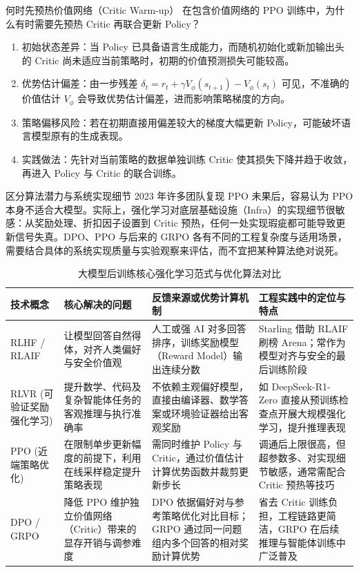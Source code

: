\documentclass[UTF8,a4paper,11pt,fontset=fandol]{ctexart}
\begin{document}
\begin{importantbox}{何时先预热价值网络（Critic Warm-up）}
在包含价值网络的 PPO 训练中，为什么有时需要先预热 Critic 再联合更新 Policy？
\begin{enumerate}
\item 初始状态差异：当 Policy 已具备语言生成能力，而随机初始化或新加输出头的 Critic 尚未适应当前策略时，初期的价值预测损失可能较高。
\item 优势估计偏差：由一步残差 \(\delta_t = r_t + \gamma V_\phi(s_{t+1}) - V_\phi(s_t)\) 可见，不准确的价值估计 \(V_\phi\) 会导致优势估计偏差，进而影响策略梯度的方向。
\item 策略偏移风险：若在初期直接用偏差较大的梯度大幅更新 Policy，可能破坏语言模型原有的生成表现。
\item 实践做法：先针对当前策略的数据单独训练 Critic 使其损失下降并趋于收敛，再进入 Policy 与 Critic 的联合训练。
\end{enumerate}
\end{importantbox}
\begin{warningbox}{区分算法潜力与系统实现细节}
2023 年许多团队复现 PPO 未果后，容易认为 PPO 本身不适合大模型。实际上，强化学习对底层基础设施（Infra）的实现细节很敏感：从奖励处理、折扣因子设置到 Critic 预热，任何一处实现瑕疵都可能导致更新信号失真。DPO、PPO 与后来的 GRPO 各有不同的工程复杂度与适用场景，需要结合具体的系统实现质量与实验观察来评估，而不宜把某种算法绝对说死。
\end{warningbox}
\begin{table}[H]\centering\small
\caption{大模型后训练核心强化学习范式与优化算法对比}
\begin{tabular}{>{\raggedright\arraybackslash}p{\dimexpr(\linewidth-8\tabcolsep)/4\relax}>{\raggedright\arraybackslash}p{\dimexpr(\linewidth-8\tabcolsep)/4\relax}>{\raggedright\arraybackslash}p{\dimexpr(\linewidth-8\tabcolsep)/4\relax}>{\raggedright\arraybackslash}p{\dimexpr(\linewidth-8\tabcolsep)/4\relax}}
\toprule
技术概念 & 核心解决的问题 & 反馈来源或优势计算机制 & 工程实践中的定位与特点\\\midrule
RLHF / RLAIF & 让模型回答自然得体，对齐人类偏好与安全价值观 & 人工或强 AI 对多回答排序，训练奖励模型（Reward Model）输出连续分数 & Starling 借助 RLAIF 刷榜 Arena；常作为模型对齐与安全的最后训练阶段\\[4pt]
RLVR (可验证奖励强化学习) & 提升数学、代码及复杂智能体任务的客观推理与执行准确率 & 不依赖主观偏好模型，直接由编译器、数学答案或环境验证器给出客观奖励 & 如 DeepSeek-R1-Zero 直接从预训练检查点开展大规模强化学习，提升推理表现\\[4pt]
PPO (近端策略优化) & 在限制单步更新幅度的前提下，利用在线采样稳定提升策略表现 & 需同时维护 Policy 与 Critic，通过价值估计计算优势函数并裁剪更新步长 & 调通后上限很高，但超参数多、对实现细节敏感，通常需配合 Critic 预热等技巧\\[4pt]
DPO / GRPO & 降低 PPO 维护独立价值网络（Critic）带来的显存开销与调参难度 & DPO 依据偏好对与参考策略优化对比目标；GRPO 通过同一问题组内多个回答的相对奖励计算优势 & 省去 Critic 训练负担，工程链路更简洁，GRPO 在后续推理与智能体训练中广泛普及\\[4pt]
\bottomrule\end{tabular}\end{table}
\end{document}

